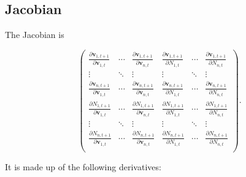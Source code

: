 \subsection*{Jacobian}

The Jacobian is

\begin{equation} \label{eq:jacobian}
    \begin{pmatrix}
        \frac{\partial \mathbf{v}_{1,t+1}}{\partial \mathbf{v}_{1,t}} & \cdots &
            \frac{\partial \mathbf{v}_{1,t+1}}{\partial \mathbf{v}_{n,t}} &
            \frac{\partial \mathbf{v}_{1,t+1}}{\partial N_{1,t}} & \cdots &
            \frac{\partial \mathbf{v}_{1,t+1}}{\partial N_{n,t}} \\
        \vdots & \ddots & \vdots & \vdots & \ddots & \vdots \\
        \frac{\partial \mathbf{v}_{n,t+1}}{\partial \mathbf{v}_{1,t}} & \cdots &
            \frac{\partial \mathbf{v}_{n,t+1}}{\partial \mathbf{v}_{n,t}} &
            \frac{\partial \mathbf{v}_{n,t+1}}{\partial N_{1,t}} & \cdots &
            \frac{\partial \mathbf{v}_{n,t+1}}{\partial N_{n,t}} \\[1ex]
%
%
        \frac{\partial N_{1,t+1}}{\partial \mathbf{v}_{1,t}} & \cdots &
            \frac{\partial N_{1,t+1}}{\partial \mathbf{v}_{n,t}} &
            \frac{\partial N_{1,t+1}}{\partial N_{1,t}} & \cdots &
            \frac{\partial N_{1,t+1}}{\partial N_{n,t}} \\
        \vdots & \ddots & \vdots & \vdots & \ddots & \vdots \\
        \frac{\partial N_{n,t+1}}{\partial \mathbf{v}_{1,t}} & \cdots &
            \frac{\partial N_{n,t+1}}{\partial \mathbf{v}_{n,t}} &
            \frac{\partial N_{n,t+1}}{\partial N_{1,t}} & \cdots &
            \frac{\partial N_{n,t+1}}{\partial N_{n,t}} \\
    \end{pmatrix}
    \text{.}
\end{equation}


It is made up of the following derivatives:

